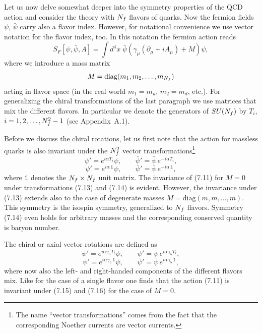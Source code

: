 Let us now delve somewhat deeper into the symmetry properties of the QCD
action and consider the theory with $N_f$ flavors of quarks. Now the fermion
fields $\psi$, $\bar\psi$ carry also a flavor index. However, for notational
convenience we use vector notation for the flavor index, too. In this notation
the fermion action reads
\begin{equation}
  S_F[\psi,\bar\psi,A] = \int d^4x\;\bar\psi\left(\gamma_\mu(\partial_\mu + iA_\mu) + M\right)\psi,
\end{equation}
where we introduce a mass matrix
\begin{equation}
  M = \mathrm{diag}(m_1, m_2, \ldots, m_{N_f})
\end{equation}
acting in flavor space (in the real world $m_1 = m_u$, $m_2 = m_d$, etc.).
For generalizing the chiral transformations of the last paragraph we use
matrices that mix the different flavors. In particular we denote the
generators of $SU(N_f)$ by $T_i$, $i = 1, 2, \ldots, N_f^2 - 1$ (see
Appendix~A.1).

Before we discuss the chiral rotations, let us first note that the action for
massless quarks is also invariant under the $N_f^2$ vector
transformations\footnote{The name ``vector transformations'' comes from the
fact that the corresponding Noether currents are vector currents.}
\begin{equation}
  \psi' = e^{i\alpha T_i}\psi,
  \qquad
  \bar\psi' = \bar\psi\,e^{-i\alpha T_i},
\end{equation}
\begin{equation}
  \psi' = e^{i\alpha\,\mathbb{1}}\psi,
  \qquad
  \bar\psi' = \bar\psi\,e^{-i\alpha\,\mathbb{1}},
\end{equation}
where $\mathbb{1}$ denotes the $N_f \times N_f$ unit matrix. The invariance of
(7.11) for $M = 0$ under transformations (7.13) and (7.14) is evident.
However, the invariance under (7.13) extends also to the case of degenerate
masses $M = \mathrm{diag}(m, m, \ldots, m)$. This symmetry is the isospin
symmetry, generalized to $N_f$ flavors. Symmetry (7.14) even holds for
arbitrary masses and the corresponding conserved quantity is baryon number.

The chiral or axial vector rotations are defined as
\begin{equation}
  \psi' = e^{i\alpha\gamma_5 T_i}\psi,
  \qquad
  \bar\psi' = \bar\psi\,e^{i\alpha\gamma_5 T_i},
\end{equation}
\begin{equation}
  \psi' = e^{i\alpha\gamma_5\,\mathbb{1}}\psi,
  \qquad
  \bar\psi' = \bar\psi\,e^{i\alpha\gamma_5\,\mathbb{1}},
\end{equation}
where now also the left- and right-handed components of the different flavors
mix. Like for the case of a single flavor one finds that the action (7.11) is
invariant under (7.15) and (7.16) for the case of $M = 0$.

